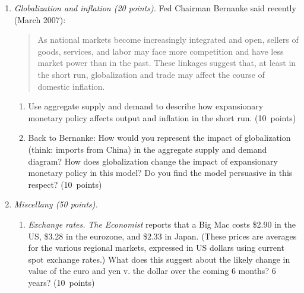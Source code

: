 \documentclass[letterpaper,12pt]{article}
\begin{document}
\begin{enumerate}
\item {\it Globalization and inflation (20 points).\/}
Fed Chairman Bernanke said recently (March 2007):  
\begin{quote}
As national markets become increasingly integrated and open, sellers of goods, services, and labor may face more competition and have less market power than in the past. 
These linkages suggest that, at least in the short run, globalization and trade may affect the course of domestic inflation.
\end{quote}
%
\begin{enumerate}
\item Use aggregate supply and demand to 
describe how expansionary monetary policy 
affects output and inflation in the short run.  
(10~points)

\item Back to Bernanke:  How would you represent the impact of 
globalization (think:  imports from China) 
in the aggregate supply and demand diagram?  
How does globalization change the impact of expansionary monetary 
policy in this model?
Do you find the model persuasive in this respect?  
(10~points)
\end{enumerate}


\begin{comment}
Answer.
\begin{enumerate}
\item This would increase both output and prices (inflation, 
loosely speaking).  Your answer should show a diagram with 
AS, AD, and AS$^*$.
AD shifts out, with the stated result.  

\item The typical argument is that AS has become flatter.
As a result, expansionary monetary policy has a 
smaller impact on inflation, and larger impact on output. 

\end{enumerate}
\end{comment}



\item {\it Miscellany (50 points).}

\begin{enumerate}

\item {\it Exchange rates.\/}
{\it The Economist\/} reports that a Big Mac costs \$2.90 in the US, \$3.28 in the eurozone,
and \$2.33 in Japan.  (These prices are averages for the various regional markets, expressed in US
dollars using current spot exchange rates.)  What does this suggest about the likely change in
value of the euro and yen v. the dollar over the coming 6 months?  6 years? (10~points)  


\end{enumerate}
\end{enumerate}
\end{document}
